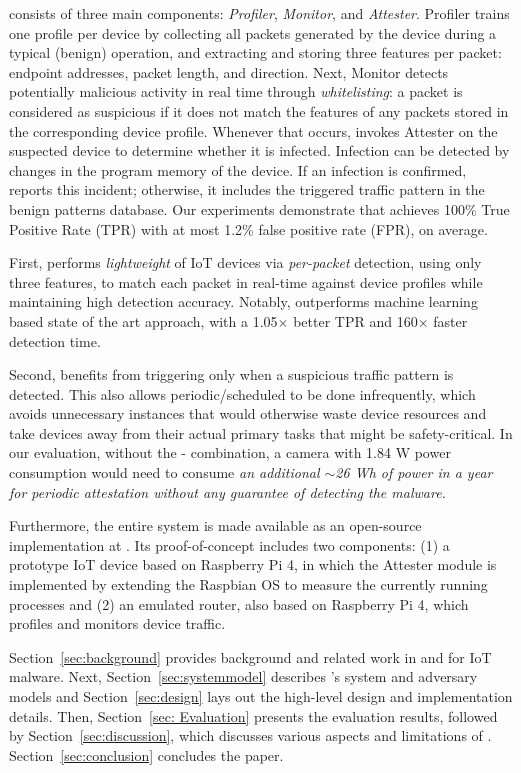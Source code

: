 \system{} consists of three main components: \textit{Profiler},  \textit{Monitor}, and \textit{Attester}. 
Profiler trains one \ta{} profile per device by collecting all packets generated by the device during a 
typical (benign) operation, and extracting and storing three features per packet: endpoint addresses, 
packet length, and direction.
Next, Monitor detects potentially malicious activity in real time through \textit{whitelisting}: 
a packet is considered as suspicious if it does not match the features of any packets stored in the corresponding device profile.
Whenever that occurs, \system{} invokes Attester on the suspected device to determine whether it is infected. Infection can be detected by changes in the program memory of the device.
If an infection is confirmed, \system{} reports this incident; otherwise, it includes the triggered traffic pattern in the benign patterns database. Our experiments demonstrate that \system{} achieves 100\% True Positive Rate (TPR) with at most 1.2\%
false positive rate (FPR), on average.

First, \system{} performs \textit{lightweight \ta} of IoT devices via {\em per-packet} detection, using only three features, to match each packet in real-time against device profiles while maintaining high detection accuracy. Notably, \system outperforms machine learning based state of the art approach, \cite{nguyen2019diot} with a 1.05$\times$ better TPR and 160$\times$ faster detection time. 

Second, \system{} benefits from triggering \ra only when a suspicious traffic pattern is detected. 
This also allows periodic/scheduled \ra{} to be done infrequently, which avoids unnecessary \ra{} 
instances that would otherwise waste device resources and take devices away from their actual primary 
tasks that might be safety-critical. In our evaluation, without the \ra{}-\ta{} combination, a camera with 1.84 W power consumption would need to consume \textit{an additional $\sim$26 Wh of power in a year for periodic attestation without any guarantee of detecting the malware.}

Furthermore, the entire \system{} system is made available as an open-source implementation at \cite{madea-repo}. Its proof-of-concept includes two components: 
(1) a prototype IoT device based on
Raspberry Pi 4, in which the Attester module is implemented
by extending the Raspbian OS to measure the currently
running processes and (2) an emulated router, 
also based on Raspberry Pi 4, which profiles and monitors device traffic.

Section~\ref{sec:background} provides background and related work in \ra{} and \ta{} for IoT malware.
Next, Section~\ref{sec:systemmodel} describes \system{}'s system and adversary models and
Section~\ref{sec:design} lays out the high-level design and implementation details.
Then, Section~\ref{sec: Evaluation} presents the evaluation results, followed by
Section~\ref{sec:discussion}, which discusses various aspects and limitations of \system.
Section~\ref{sec:conclusion} concludes the paper.